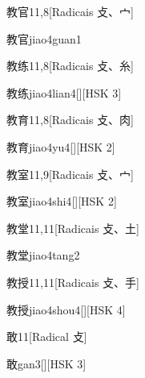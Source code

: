 \begin{entry}{教官}{11,8}[Radicais ⽁、⼧]
  \begin{phonetics}{教官}{jiao4guan1}
  \end{phonetics}
\end{entry}

\begin{entry}{教练}{11,8}[Radicais ⽁、⽷]
  \begin{phonetics}{教练}{jiao4lian4}[][HSK 3]
  \end{phonetics}
\end{entry}

\begin{entry}{教育}{11,8}[Radicais ⽁、⾁]
  \begin{phonetics}{教育}{jiao4yu4}[][HSK 2]
  \end{phonetics}
\end{entry}

\begin{entry}{教室}{11,9}[Radicais ⽁、⼧]
  \begin{phonetics}{教室}{jiao4shi4}[][HSK 2]
  \end{phonetics}
\end{entry}

\begin{entry}{教堂}{11,11}[Radicais ⽁、⼟]
  \begin{phonetics}{教堂}{jiao4tang2}
  \end{phonetics}
\end{entry}

\begin{entry}{教授}{11,11}[Radicais ⽁、⼿]
  \begin{phonetics}{教授}{jiao4shou4}[][HSK 4]
  \end{phonetics}
\end{entry}

\begin{entry}{敢}{11}[Radical ⽁]
  \begin{phonetics}{敢}{gan3}[][HSK 3]
  \end{phonetics}
\end{entry}

